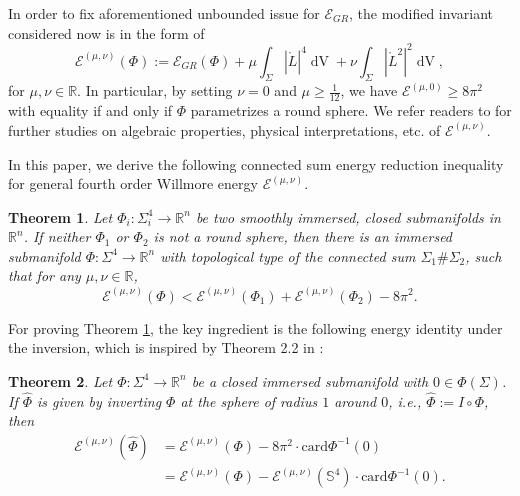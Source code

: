 \documentclass[11pt,letterpaper]{amsart}
\DeclareMathOperator{\dvol}{dV}
\newcommand{\mE}{\mathcal{E}}
\newcommand{\bR}{\mathbb{R}}
\newtheorem{theorem}{Theorem}[section]
\theoremstyle{definition}
\theoremstyle{remark}
\numberwithin{equation}{section}
\begin{document}
In order to fix aforementioned unbounded issue for $\mE_{GR}$, the modified invariant considered now is in the form of 
\begin{equation}\label{general-fourth-order-Willmore-energy}
   \mE^{(\mu,\nu)}(\Phi):=\mE_{GR}(\Phi)+\mu \int_{\Sigma} |\mathring{L}|^4\dvol+\nu \int_{\Sigma}|\mathring{L}^2|^2 \dvol,
\end{equation}
for $\mu, \nu \in \bR.$ In particular, by setting $\nu=0$ and $\mu \geq \frac{1}{12}$, we have $ \mE^{(\mu,0)}\geq 8\pi^2$ with equality if and only if $\Phi$ parametrizes a round sphere.   We refer readers to \cite{Blitz-Gover-Waldon24,Gover-Waldon20,Case-Graham-Kuo} for further studies on algebraic properties, physical interpretations, etc. of $\mE^{(\mu,\nu)}$. 

In this paper, we derive the following connected sum energy reduction inequality for general fourth order Willmore energy $\mE^{(\mu,\nu)}$. 
\begin{theorem}\label{Main 1}
    Let $\Phi_i: \Sigma^4_i \to \mathbb{R}^n $ be two smoothly immersed, closed submanifolds in $\mathbb{R}^n$. If neither $\Phi_1$ or $\Phi_2$ is not a round sphere, then there is an immersed submanifold $\Phi: \Sigma^4 \to \mathbb{R}^n$ with topological type of the connected sum $\Sigma_1 \# \Sigma_2$, such that for any $\mu, \nu \in \bR$,
    \begin{equation}\label{Connected-Sum-Energy-Reduction-4}
         \mathcal{E}^{(\mu, \nu)}(\Phi) < \mathcal{E}^{(\mu, \nu)}(\Phi_1) + \mathcal{E}^{(\mu, \nu)}(\Phi_2) -8\pi^2.
    \end{equation}
\end{theorem}

For proving Theorem \ref{Main 1}, the key ingredient is the following energy identity under the inversion, which is inspired by Theorem 2.2 in \cite{Bauer-Kuwert03}:
\begin{theorem}\label{Main 2}
    Let $\Phi: \Sigma^4\to \bR^n$ be a closed immersed submanifold with $0\in \Phi(\Sigma)$. If $\hat{\Phi}$ is given by inverting $\Phi$ at the sphere of radius $1$ around $0$, i.e., $\hat{\Phi}:=I\circ \Phi$, then 
    \begin{equation}\label{loss of energy}
        \begin{split}
    \mE^{(\mu, \nu)}(\hat{\Phi})&=\mE^{(\mu, \nu)}(\Phi)-8\pi^2\cdot \mathrm{card} \Phi^{-1}(0)\\
    &=\mE^{(\mu, \nu)}(\Phi)-\mE^{(\mu, \nu)}(\mathbb{S}^4)\cdot \mathrm{card} \Phi^{-1}(0).
    \end{split}
    \end{equation}
\end{theorem}
\end{document}
